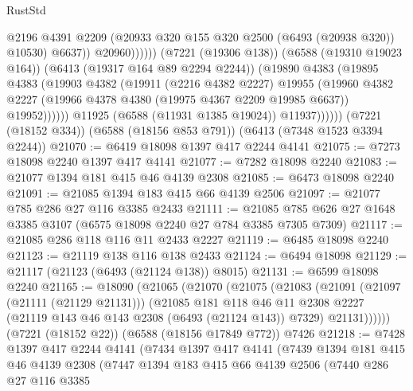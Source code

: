 \begin{lexlean}{RustStd}
\begin{coremodule}
                                  @2196
                                  @4391
                                  @2209
                                  (@20933 @320 @155 @320 @2500 (@6493 (@20938 @320)) @10530)
                                  @6637))
                              @20960))))))
                  (@7221 (@19306 @138))
                  (@6588 (@19310 @19023 @164))
                  (@6413 (@19317 @164 @89 @2294 @2244))
                  (@19890
                    @4383
                    (@19895
                      @4383
                      (@19903
                        @4382
                        (@19911
                          (@2216 @4382 @2227)
                          @19955
                          (@19960
                            @4382
                            @2227
                            (@19966 @4378 @4380 (@19975 @4367 @2209 @19985 @6637))
                            @19952))))))
                @11925
                (@6588 (@11931 @1385 @19024))
                @11937))))))
    (@7221 (@18152 @334))
    (@6588 (@18156 @853 @791))
    (@6413 (@7348 @1523 @3394 @2244))
@21070 := @6419 @18098 @1397 @417 @2244 @4141
@21075 := @7273 @18098 @2240 @1397 @417 @4141
@21077 := @7282 @18098 @2240
@21083 := @21077 @1394 @181 @415 @46 @4139 @2308
@21085 := @6473 @18098 @2240
@21091 := @21085 @1394 @183 @415 @66 @4139 @2506
@21097 := @21077 @785 @286 @27 @116 @3385 @2433
@21111 := @21085 @785 @626 @27 @1648 @3385 @3107 (@6575 @18098 @2240 @27 @784 @3385 @7305 @7309)
@21117 := @21085 @286 @118 @116 @11 @2433 @2227
@21119 := @6485 @18098 @2240
@21123 := @21119 @138 @116 @138 @2433
@21124 := @6494 @18098
@21129 := @21117 (@21123 (@6493 (@21124 @138)) @8015)
@21131 := @6599 @18098 @2240
@21165 := @18090
    (@21065
      (@21070
        (@21075
          (@21083
            (@21091
              (@21097 (@21111 (@21129 @21131)))
              (@21085
                @181
                @118
                @46
                @11
                @2308
                @2227
                (@21119 @143 @46 @143 @2308 (@6493 (@21124 @143)) @7329)
                @21131))))))
    (@7221 (@18152 @22))
    (@6588 (@18156 @17849 @772))
    @7426
@21218 := @7428
    @1397
    @417
    @2244
    @4141
    (@7434
      @1397
      @417
      @4141
      (@7439
        @1394
        @181
        @415
        @46
        @4139
        @2308
        (@7447
          @1394
          @183
          @415
          @66
          @4139
          @2506
          (@7440
            @286
            @27
            @116
            @3385

\end{coremodule}
\end{lexlean}
